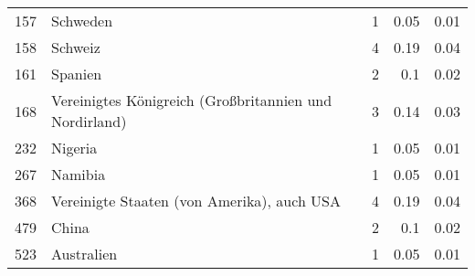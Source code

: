 \begin{longtable}{lXrrr}
        157 & \multicolumn{1}{X}{Schweden} & %
          \num{1} &
          \num[round-mode=places,round-precision=2]{0.05} &
          \num[round-mode=places,round-precision=2]{0.01} \\

        158 & \multicolumn{1}{X}{Schweiz} & %
          \num{4} &
          \num[round-mode=places,round-precision=2]{0.19} &
          \num[round-mode=places,round-precision=2]{0.04} \\

        161 & \multicolumn{1}{X}{Spanien} & %
          \num{2} &
          \num[round-mode=places,round-precision=2]{0.1} &
          \num[round-mode=places,round-precision=2]{0.02} \\

        168 & \multicolumn{1}{X}{Vereinigtes Königreich (Großbritannien und Nordirland)} & %
          \num{3} &
          \num[round-mode=places,round-precision=2]{0.14} &
          \num[round-mode=places,round-precision=2]{0.03} \\

        232 & \multicolumn{1}{X}{Nigeria} & %
          \num{1} &
          \num[round-mode=places,round-precision=2]{0.05} &
          \num[round-mode=places,round-precision=2]{0.01} \\

        267 & \multicolumn{1}{X}{Namibia} & %
          \num{1} &
          \num[round-mode=places,round-precision=2]{0.05} &
          \num[round-mode=places,round-precision=2]{0.01} \\

        368 & \multicolumn{1}{X}{Vereinigte Staaten (von Amerika), auch USA} & %
          \num{4} &
          \num[round-mode=places,round-precision=2]{0.19} &
          \num[round-mode=places,round-precision=2]{0.04} \\

        479 & \multicolumn{1}{X}{China} & %
          \num{2} &
          \num[round-mode=places,round-precision=2]{0.1} &
          \num[round-mode=places,round-precision=2]{0.02} \\

        523 & \multicolumn{1}{X}{Australien} & %
          \num{1} &
          \num[round-mode=places,round-precision=2]{0.05} &
          \num[round-mode=places,round-precision=2]{0.01} \\


\end{longtable}
